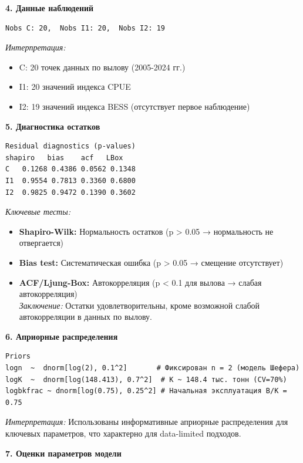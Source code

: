 \documentclass[
  letterpaper,
  DIV=11,
  numbers=noendperiod]{scrreprt}
\providecommand{\tightlist}{%
  \setlength{\itemsep}{0pt}\setlength{\parskip}{0pt}}
\begin{document}
\textbf{4. Данные наблюдений}

\begin{verbatim}
Nobs C: 20,  Nobs I1: 20,  Nobs I2: 19
\end{verbatim}

\emph{Интерпретация:}

\begin{itemize}
\tightlist
\item
  C: 20 точек данных по вылову (2005-2024 гг.)
\item
  I1: 20 значений индекса CPUE
\item
  I2: 19 значений индекса BESS (отсутствует первое наблюдение)
\end{itemize}

\textbf{5. Диагностика остатков}

\begin{verbatim}
Residual diagnostics (p-values)
shapiro   bias    acf   LBox
C   0.1268 0.4386 0.0562 0.1348
I1  0.9554 0.7813 0.3360 0.6800
I2  0.9825 0.9472 0.1390 0.3602  
\end{verbatim}

\emph{Ключевые тесты:}

\begin{itemize}
\tightlist
\item
  \textbf{Shapiro-Wilk:} Нормальность остатков (p \textgreater{} 0.05 →
  нормальность не отвергается)
\item
  \textbf{Bias test:} Систематическая ошибка (p \textgreater{} 0.05 →
  смещение отсутствует)
\item
  \textbf{ACF/Ljung-Box:} Автокорреляция (p \textless{} 0.1 для вылова →
  слабая автокорреляция)\\
  \emph{Заключение:} Остатки удовлетворительны, кроме возможной слабой
  автокорреляции в данных по вылову.
\end{itemize}

\textbf{6. Априорные распределения}

\begin{verbatim}
Priors
logn  ~  dnorm[log(2), 0.1^2]       # Фиксирован n = 2 (модель Шефера)   
logK  ~  dnorm[log(148.413), 0.7^2]  # K ~ 148.4 тыс. тонн (CV=70%)   
logbkfrac ~ dnorm[log(0.75), 0.25^2] # Начальная эксплуатация B/K = 0.75
\end{verbatim}

\emph{Интерпретация:} Использованы информативные априорные распределения
для ключевых параметров, что характерно для data-limited подходов.

\textbf{7. Оценки параметров модели}
\end{document}

